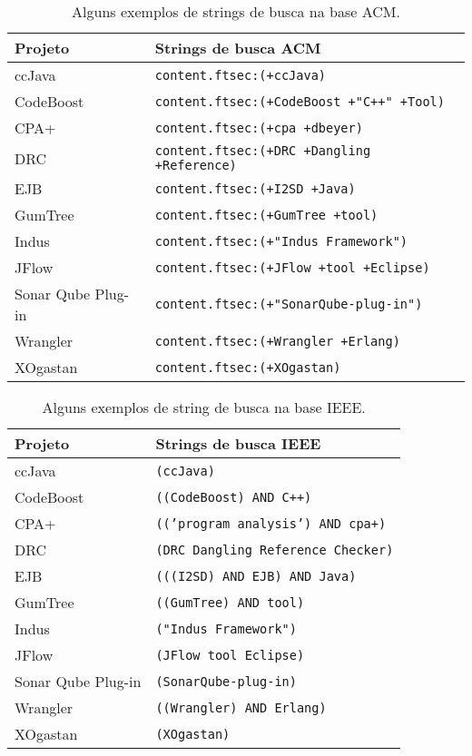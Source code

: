 
\begin{table}[h]
\caption{Alguns exemplos de strings de busca na base ACM.}
\centering
\begin{tabular}{l p{10cm}}
  \hline
  {\bf Projeto} & {\bf Strings de busca ACM} \\
  \hline
  ccJava & \texttt{content.ftsec:(+ccJava)} \\
  CodeBoost & \texttt{content.ftsec:(+CodeBoost +"C++" +Tool)} \\
  CPA+ & \texttt{content.ftsec:(+cpa +dbeyer)} \\
  DRC & \texttt{content.ftsec:(+DRC +Dangling +Reference)} \\
  EJB & \texttt{content.ftsec:(+I2SD +Java)} \\
  GumTree & \texttt{content.ftsec:(+GumTree +tool)} \\
  Indus & \texttt{content.ftsec:(+"Indus Framework")} \\
  JFlow & \texttt{content.ftsec:(+JFlow +tool +Eclipse)} \\
  Sonar Qube Plug-in & \texttt{content.ftsec:(+"SonarQube-plug-in")} \\
  Wrangler & \texttt{content.ftsec:(+Wrangler +Erlang)} \\
  XOgastan & \texttt{content.ftsec:(+XOgastan)} \\
  \hline
\end{tabular}
\label{search-string-table-acm}
\end{table}

\begin{table}[h]
\caption{Alguns exemplos de string de busca na base IEEE.}
\centering
\begin{tabular}{l p{10cm}}
  \hline
  {\bf Projeto} & {\bf Strings de busca IEEE} \\
  \hline
  ccJava & \texttt{(ccJava)} \\
  CodeBoost & \texttt{((CodeBoost) AND C++)} \\
  CPA+ & \texttt{(('program analysis') AND cpa+)} \\
  DRC & \texttt{(DRC Dangling Reference Checker)} \\
  EJB & \texttt{(((I2SD) AND EJB) AND Java)} \\
  GumTree & \texttt{((GumTree) AND tool)} \\
  Indus & \texttt{("Indus Framework")} \\
  JFlow & \texttt{(JFlow tool Eclipse)} \\
  Sonar Qube Plug-in & \texttt{(SonarQube-plug-in)} \\
  Wrangler & \texttt{((Wrangler) AND Erlang)} \\
  XOgastan & \texttt{(XOgastan)} \\
  \hline
\end{tabular}
\label{search-string-table-ieee}
\end{table}

